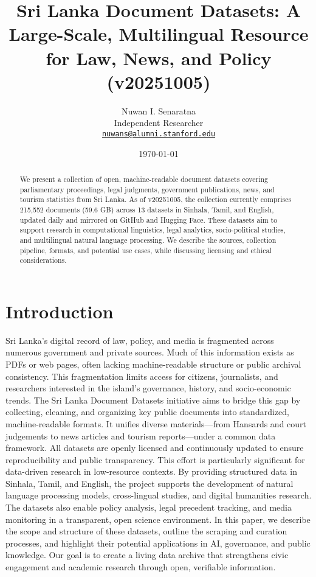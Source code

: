 \documentclass[10pt,a4paper,twocolumn]{article}%
\title{Sri Lanka Document Datasets: A Large{-}Scale, Multilingual Resource for Law, News, and Policy (v20251005)}%
\author{Nuwan I. Senaratna\\Independent Researcher\\\vspace{0.25em}\texttt{\href{mailto:nuwans@alumni.stanford.edu}{nuwans@alumni.stanford.edu}}}%
\date{\today}%
\begin{document}
%
\normalsize%
\maketitle%
\begin{abstract}%
We present a collection of open, machine{-}readable document datasets covering parliamentary proceedings, legal judgments, government publications, news, and tourism statistics from Sri Lanka.  As of v20251005, the collection currently comprises 215,552 documents (59.6 GB) across 13 datasets in Sinhala, Tamil, and English, updated daily and mirrored on GitHub and Hugging Face.  These datasets aim to support research in computational linguistics, legal analytics, socio{-}political studies, and multilingual natural language processing.  We describe the sources, collection pipeline, formats, and potential use cases, while discussing licensing and ethical considerations.%
\newline%
\newline%
\end{abstract}%
\section{Introduction}%
\label{sec:Introduction}%
Sri Lanka’s digital record of law, policy, and media is fragmented across numerous government and private sources. Much of this information exists as PDFs or web pages, often lacking machine{-}readable structure or public archival consistency. This fragmentation limits access for citizens, journalists, and researchers interested in the island’s governance, history, and socio{-}economic trends.%
\newline%
\newline%
The Sri Lanka Document Datasets initiative aims to bridge this gap by collecting, cleaning, and organizing key public documents into standardized, machine{-}readable formats. It unifies diverse materials—from Hansards and court judgements to news articles and tourism reports—under a common data framework. All datasets are openly licensed and continuously updated to ensure reproducibility and public transparency.%
\newline%
\newline%
This effort is particularly significant for data{-}driven research in low{-}resource contexts. By providing structured data in Sinhala, Tamil, and English, the project supports the development of natural language processing models, cross{-}lingual studies, and digital humanities research. The datasets also enable policy analysis, legal precedent tracking, and media monitoring in a transparent, open science environment.%
\newline%
\newline%
In this paper, we describe the scope and structure of these datasets, outline the scraping and curation processes, and highlight their potential applications in AI, governance, and public knowledge. Our goal is to create a living data archive that strengthens civic engagement and academic research through open, verifiable information.%
\newline%
\newline
\end{document}
